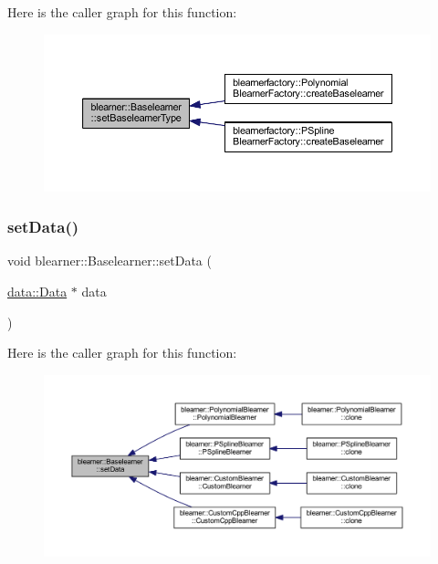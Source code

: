 Here is the caller graph for this function\+:
\nopagebreak
\begin{figure}[H]
\begin{center}
\leavevmode
\includegraphics[width=350pt]{classblearner_1_1_baselearner_a8d78e851bae5f5b93dc46eb13d2d1ee1_icgraph}
\end{center}
\end{figure}
\mbox{\label{classblearner_1_1_baselearner_a29122c6125ef6ec03ad84602b3e2d0d4}} 
\subsubsection{\texorpdfstring{set\+Data()}{setData()}}
{\footnotesize\ttfamily void blearner\+::\+Baselearner\+::set\+Data (\begin{DoxyParamCaption}\item[{\mbox{\hyperlink{classdata_1_1_data}{data\+::\+Data}} $\ast$}]{data }\end{DoxyParamCaption})}

Here is the caller graph for this function\+:
\nopagebreak
\begin{figure}[H]
\begin{center}
\leavevmode
\includegraphics[width=350pt]{classblearner_1_1_baselearner_a29122c6125ef6ec03ad84602b3e2d0d4_icgraph}
\end{center}
\end{figure}
\mbox{\label{classblearner_1_1_baselearner_a6669906a481cbdd516dce8df6f6e5b76}} 
